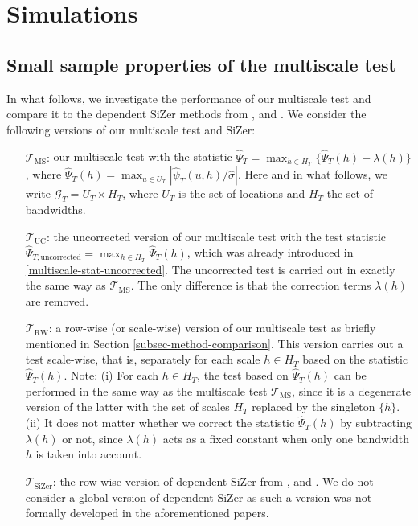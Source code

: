 
\section{Simulations}\label{sec-sim}


\subsection{Small sample properties of the multiscale test}\label{subsec-sim-multiscale}


In what follows, we investigate the performance of our multiscale test and compare it to the dependent SiZer methods from \cite{Rondonotti2004}, \cite{Rondonotti2007} and \cite{ParkHannigKang2009}. We consider the following versions of our multiscale test and SiZer:
\begin{itemize}[leftmargin=1.25cm]

\item[$\mathcal{T}_{\text{MS}}$:] our multiscale test with the statistic $\widehat{\Psi}_T = \max_{h \in H_T} \{ \widehat{\Psi}_T(h) - \lambda(h) \}$, where $\widehat{\Psi}_T(h) = \max_{u \in U_T} |\widehat{\psi}_T(u,h) / \widehat{\sigma}|$. Here and in what follows, we write $\mathcal{G}_T = U_T \times H_T$, where $U_T$ is the set of locations and $H_T$ the set of bandwidths.  

\item[$\mathcal{T}_{\text{UC}}$:] the uncorrected version of our multiscale test with the test statistic $\widehat{\Psi}_{T,\text{uncorrected}} = \max_{h \in H_T} \widehat{\Psi}_T(h)$, which was already introduced in \eqref{multiscale-stat-uncorrected}. The uncorrected test is carried out in exactly the same way as $\mathcal{T}_{\text{MS}}$. The only difference is that the correction terms $\lambda(h)$ are removed. 

\item[$\mathcal{T}_{\text{RW}}$:] a row-wise (or scale-wise) version of our multiscale test as briefly mentioned in Section \ref{subsec-method-comparison}. This version carries out a test scale-wise, that is, separately for each scale $h \in H_T$ based on the statistic $\widehat{\Psi}_T(h)$. Note: (i) For each $h \in H_T$, the test based on $\widehat{\Psi}_T(h)$ can be performed in the same way as the multiscale test $\mathcal{T}_{\text{MS}}$, since it is a degenerate version of the latter with the set of scales $H_T$ replaced by the singleton $\{h\}$. (ii) It does not matter whether we correct the statistic $\widehat{\Psi}_T(h)$ by subtracting $\lambda(h)$ or not, since $\lambda(h)$ acts as a fixed constant when only one bandwidth $h$ is taken into account. 

\item[$\mathcal{T}_{\text{SiZer}}$:] the row-wise version of dependent SiZer from \cite{Rondonotti2004}, \cite{Rondonotti2007} and \cite{ParkHannigKang2009}. We do not consider a global version of dependent SiZer as such a version was not formally developed in the aforementioned papers. 

\end{itemize}


